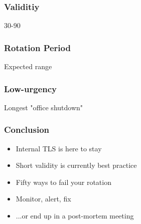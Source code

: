 
\begin{frame}
\frametitle{Validitiy}

30-90

\end{frame}

\begin{frame}
\frametitle{Rotation Period}

Expected range

\end{frame}

\begin{frame}
\frametitle{Low-urgency}

Longest "office shutdown"
\end{frame}

\begin{frame}
\frametitle{Conclusion}

\begin{itemize}
\item Internal TLS is here to stay
\item Short validity is currently best practice
\item Fifty ways to fail your rotation
\item Monitor, alert, fix \pause
\item ...or end up in a post-mortem meeting
\end{itemize}
\end{frame}



